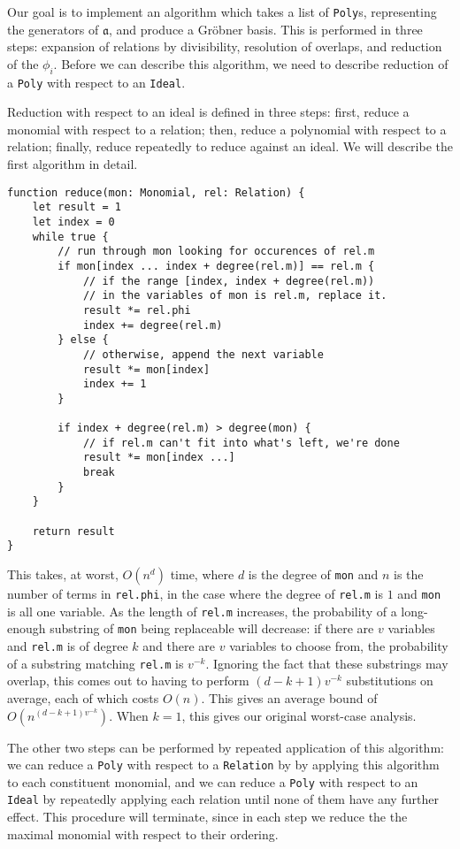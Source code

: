 Our goal is to implement an algorithm which takes a list of \verb|Poly|s, representing the
generators of $\mathfrak{a}$, and produce a Gr\"obner basis. This is performed in three
steps: expansion of relations by divisibility, resolution of overlaps, and reduction
of the $\phi_i$. Before
we can describe this algorithm, we need to describe reduction of a \verb|Poly| with
respect to an \verb|Ideal|.

\begin{subalg}
    Reduction with respect to an ideal is defined in three steps: first, reduce
    a monomial with respect to a relation; then, reduce a polynomial with respect
    to a relation; finally, reduce repeatedly to reduce against an ideal. We will
    describe the first algorithm in detail.
\begin{verbatim}
function reduce(mon: Monomial, rel: Relation) {
    let result = 1
    let index = 0
    while true {
        // run through mon looking for occurences of rel.m
        if mon[index ... index + degree(rel.m)] == rel.m {
            // if the range [index, index + degree(rel.m)) 
            // in the variables of mon is rel.m, replace it.
            result *= rel.phi
            index += degree(rel.m)
        } else {
            // otherwise, append the next variable
            result *= mon[index]
            index += 1
        }
        
        if index + degree(rel.m) > degree(mon) {
            // if rel.m can't fit into what's left, we're done
            result *= mon[index ...]
            break
        }
    }
    
    return result
}
\end{verbatim}
    This takes, at worst, $O(n^d)$ time, where $d$ is the
    degree of \verb|mon| and $n$ is the number of terms in \verb|rel.phi|,
    in the case where the degree of \verb|rel.m| is $1$ and \verb|mon| is all one
    variable. As the length of \verb|rel.m| increases, the probability of a long-enough
    substring of \verb|mon| being replaceable will decrease: if there are $v$ variables
    and \verb|rel.m| is of degree $k$ and there are $v$ variables to choose from,
    the probability of a substring matching \verb|rel.m| is $v^{-k}$. Ignoring
    the fact that these substrings may overlap, this comes out to having to perform
    $(d-k+1)v^{-k}$ substitutions on average, each of which costs $O(n)$. This gives
    an average bound of $O(n^{(d-k+1)v^{-k}})$. When $k=1$, this gives our original
    worst-case analysis.
    
    The other two steps can be performed by repeated application of this algorithm:
    we can reduce a \verb|Poly| with respect to a \verb|Relation| by by applying 
    this algorithm to each constituent monomial, and we can reduce a \verb|Poly| with
    respect to an \verb|Ideal| by repeatedly applying each relation until none of them
    have any further effect. This procedure will terminate, since in each step
    we reduce the the maximal monomial with respect to their ordering.
\end{subalg}

